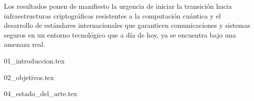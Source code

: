 \documentclass[minitoc, hidelinks, headlogo, framedcover]{tfeEPCC}
\begin{document}
Los resultados ponen de manifiesto la urgencia de iniciar la transición hacia infraestructuras criptográficas resistentes a la computación cuántica y el desarrollo de estándares internacionales que garanticen comunicaciones y sistemas seguros en un entorno tecnológico que a día de hoy, ya se encuentra bajo una amenaza real.

\newpage
\pagestyle{plain}
\setcounter{page}{1}
\tableofcontents
\newpage
\listoftables
\newpage
\listoffigures
\newpage




\pagestyle{fancy}
\setcounter{page}{1}

{01_introduccion.tex}

{02_objetivos.tex}

{04_estado_del_arte.tex}
\end{document}
